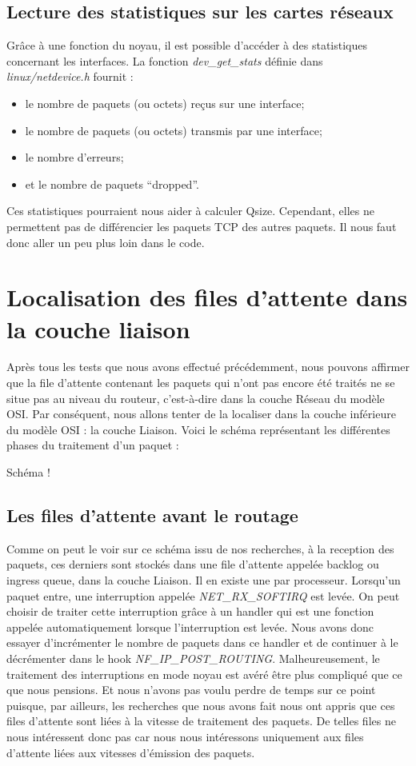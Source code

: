 \documentclass[a4paper]{article}
\begin{document}
\subsection{Lecture des statistiques sur les cartes réseaux}
Grâce à une fonction du noyau, il est possible d’accéder à des
statistiques concernant les interfaces. La fonction \textit{dev\_get\_stats}
définie dans \textit{linux/netdevice.h} fournit :
\begin{itemize}
	\item le nombre de paquets (ou octets) reçus sur une interface;
	\item le nombre de paquets (ou octets) transmis par une interface;
	\item le nombre d’erreurs;
	\item et le nombre de paquets “dropped”.
\end{itemize}

Ces statistiques pourraient nous aider à calculer Qsize. Cependant,
elles ne permettent pas de différencier les paquets TCP des autres paquets.
Il nous faut donc aller un peu plus loin dans le code.

\section{Localisation des files d'attente dans la couche liaison}

Après tous les tests que nous avons effectué précédemment, nous pouvons affirmer
 que la file d'attente contenant les paquets qui n'ont pas encore été traités ne
  se situe pas au niveau du routeur, c'est-à-dire dans la couche Réseau du modèle 
  OSI. Par conséquent, nous allons tenter de la localiser dans la couche
   inférieure du modèle OSI : la couche Liaison. Voici le schéma représentant
    les différentes phases du traitement d'un paquet :

Schéma !

\subsection{Les files d'attente avant le routage}
Comme on peut le voir sur ce schéma issu de nos recherches, à la reception des paquets, ces derniers sont stockés dans une file d'attente appelée backlog ou ingress queue, dans la couche Liaison. Il en existe une par processeur.
Lorsqu'un paquet entre, une interruption appelée \textit{NET\_RX\_SOFTIRQ} est levée. On peut choisir de traiter cette interruption grâce à un handler qui est une fonction appelée automatiquement lorsque l'interruption est levée. Nous avons donc essayer d'incrémenter le nombre de paquets dans ce handler et de continuer à le décrémenter  dans le hook \textit{NF\_IP\_POST\_ROUTING}. Malheureusement, le traitement des interruptions en mode noyau est avéré être plus compliqué que ce que nous pensions. Et nous n'avons pas voulu perdre de temps sur ce point puisque, par ailleurs, les recherches que nous avons fait nous ont appris que ces files d'attente sont liées à la vitesse de traitement des paquets. De telles files ne nous intéressent donc pas car nous nous intéressons uniquement aux files d'attente liées aux vitesses d'émission des paquets. 
\end{document}

